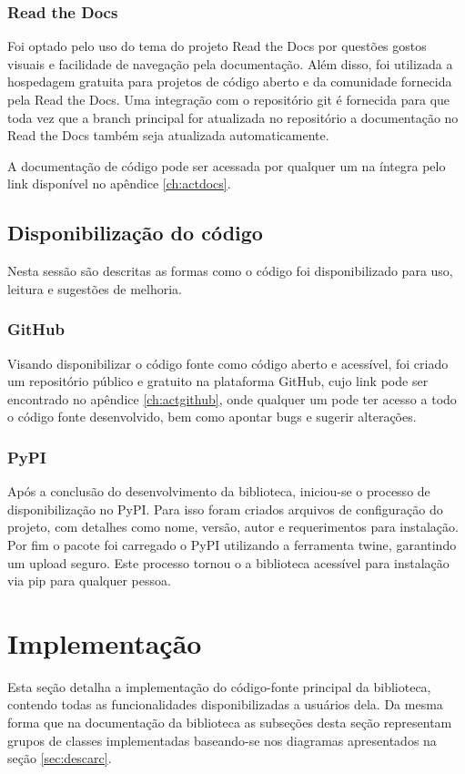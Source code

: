 \subsubsection{Read the Docs}

Foi optado pelo uso do tema do projeto Read the Docs por questões gostos visuais e facilidade de navegação pela
documentação.
Além disso, foi utilizada a hospedagem gratuita para projetos de código aberto e da comunidade fornecida pela Read the
Docs.
Uma integração com o repositório git é fornecida para que toda vez que a branch principal for atualizada no repositório
a documentação no Read the Docs também seja atualizada automaticamente.

A documentação de código pode ser acessada por qualquer um na íntegra pelo link disponível no apêndice \ref{ch:actdocs}.

\subsection{Disponibilização do código}

Nesta sessão são descritas as formas como o código foi disponibilizado para uso, leitura e sugestões de melhoria.

\subsubsection{GitHub}

Visando disponibilizar o código fonte como código aberto e acessível, foi criado um repositório público e gratuito na
plataforma GitHub, cujo link pode ser encontrado no apêndice \ref{ch:actgithub}, onde qualquer um pode ter acesso a todo
o código fonte desenvolvido, bem como apontar bugs e sugerir alterações.

\subsubsection{PyPI}

Após a conclusão do desenvolvimento da biblioteca, iniciou-se o processo de disponibilização no PyPI\@.
Para isso foram criados arquivos de configuração do projeto, com detalhes como nome, versão, autor e requerimentos
para instalação.
Por fim o pacote foi carregado o PyPI utilizando a ferramenta twine, garantindo um upload seguro.
Este processo tornou o a biblioteca acessível para instalação via pip para qualquer pessoa.

\section{Implementação}\label{sec:imp}
Esta seção detalha a implementação do código-fonte principal da biblioteca, contendo todas as funcionalidades
disponibilizadas a usuários dela.
Da mesma forma que na documentação da biblioteca as subseções desta seção representam grupos de classes implementadas
baseando-se nos diagramas apresentados na seção \ref{sec:descarc}.

